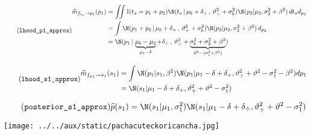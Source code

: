 \documentclass[shownotes,aspectratio=169]{beamer}
\begin{document}
\begin{frame}[plain]
 \begin{equation}\label{eq:^m_fta_p} \tag{\texttt{lhood\_p1\_approx}}
\begin{split}
\widehat{m}_{f_{t_a} \rightarrow p_1}(p_1) &= \iint \mathbb{I}(t_a = p_1 + p_2) \N(t_a \, | \, \mu_b + \delta_{\div} \, , \, \vartheta_{\div}^2 + \sigma_b^2) \N(p_2 | \mu_2 , \sigma_2^2 + \beta^2)  \, d{t_a} d_{p_2} \\
& = \int \N(p_1 + p_2 \, | \, \mu_b + \delta_{\div} \, , \, \vartheta_{\div}^2 + \sigma_b^2) \N(p_2 | \mu_2 , \sigma_2^2+ \beta^2 )   \, d_{p_2} \\
& = \N( p_1 \,|\,  \underbrace{\mu_b - \mu_2}_{\mu_1-\delta} + \delta_{\div}  \,,\,\vartheta_{\div}^2 + \underbrace{\sigma_b^2 + \sigma_2^2 + \beta^2}_{\vartheta^2 - (\sigma_1^2 + \beta^2)})  \\
\end{split}
\end{equation}
\end{frame}

\begin{frame}[plain]
 \begin{equation}\label{eq:^m_fp_s} \tag{\texttt{lhood\_s1\_approx}}
\begin{split}
\widehat{m}_{f_{p_1} \rightarrow s_1}(s_1) & = \int \N(p_1|s_1,\beta^2) \N(p_1| \mu_1 - \delta + \delta_{\div}, \vartheta_{\div}^2 + \vartheta^2 - \sigma_1^2 - \beta^2)dp_1 \\
& = \N(s_1| \mu_1 - \delta + \delta_{\div}, \vartheta_{\div}^2 + \vartheta^2 - \sigma_1^2)
\end{split}
\end{equation}
\end{frame}

\begin{frame}[plain]
\begin{equation}\label{eq:^p_s} \tag{\texttt{posterior\_s1\_approx}}
 \widehat{p}(s_1) = \N(s_1|\mu_1, \sigma_1^2) \N(s_1| \mu_1 - \delta + \delta_{\div}, \vartheta_{\div}^2 + \vartheta^2 - \sigma_1^2)
\end{equation}
\end{frame}


\begin{frame}[plain]
\centering
  \texttt{[image: ../../aux/static/pachacuteckoricancha.jpg]}
\end{frame}
\end{document}
